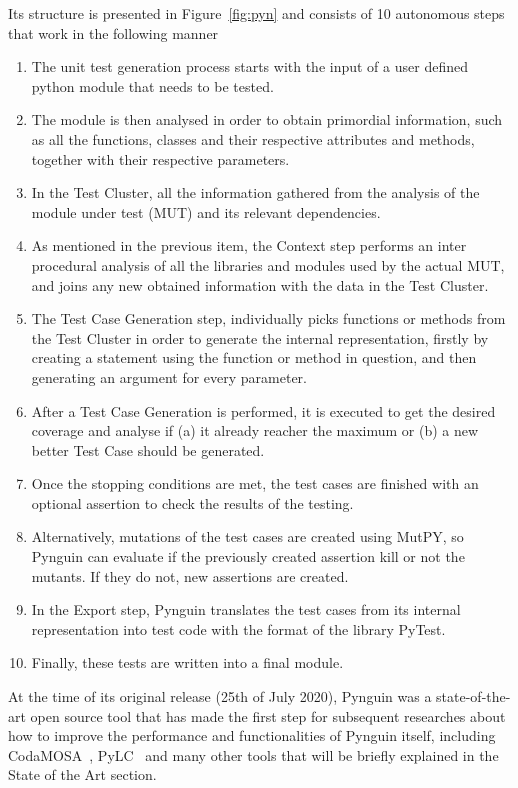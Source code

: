 \documentclass[%
  chapterprefix=false,%
  open=right,%
  twoside=true,%
  paper=a4,%
  logofile={Figures/logo.png},%
  thesistype=master,%
  UKenglish,%
]{se2thesis}
\begin{document}
Its structure is presented in Figure~\ref{fig:pyn} and consists of 10 autonomous steps that work in the following manner
\begin{enumerate}
  \item The unit test generation process starts with the input of a user defined python module that needs to be tested.
  \item The module is then analysed in order to obtain primordial information, such as all the functions, classes and their respective attributes and methods, together with their respective parameters.
  \item In the Test Cluster, all the information gathered from the analysis of the module under test (MUT) and its relevant dependencies.
  \item As mentioned in the previous item, the Context step performs an inter procedural analysis of all the libraries and modules used by the actual MUT, and joins any new obtained information with the data in the Test Cluster.
  \item The Test Case Generation step, individually picks functions or methods from the Test Cluster in order to generate the internal representation, firstly by creating a statement using the function or method in question, and then generating an argument for every parameter.
  \item After a Test Case Generation is performed, it is executed to get the desired coverage and analyse if (a) it already reacher the maximum or (b) a new better Test Case should be generated.
  \item Once the stopping conditions are met, the test cases are finished with an optional assertion to check the results of the testing.
  \item Alternatively, mutations of the test cases are created using MutPY, so Pynguin can evaluate if the previously created assertion kill or not the mutants.
  If they do not, new assertions are created.
  \item In the Export step, Pynguin translates the test cases from its internal representation into test code with the format of the library PyTest.
  \item Finally, these tests are written into a final module.
  
\end{enumerate}
At the time of its original release (25th of July 2020), Pynguin was a state-of-the-art open source tool that has made the first step for subsequent researches about how to improve the performance and functionalities of Pynguin itself, including CodaMOSA~\cite{DBLP:conf/icse/LemieuxILS23}, PyLC~\cite{DBLP:conf/sac/SalariEAS23} and many other tools that will be briefly explained in the State of the Art section.
\end{document}
